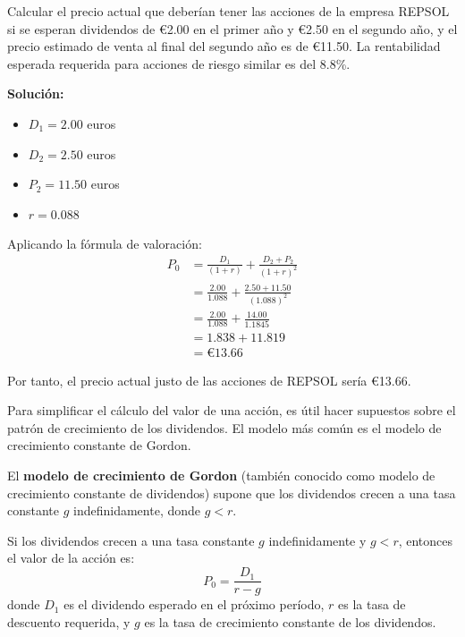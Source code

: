 \begin{ejemplo}
Calcular el precio actual que deberían tener las acciones de la empresa REPSOL si se esperan dividendos de €2.00 en el primer año y €2.50 en el segundo año, y el precio estimado de venta al final del segundo año es de €11.50. La rentabilidad esperada requerida para acciones de riesgo similar es del 8.8\%.

\textbf{Solución:}
\begin{itemize}
\item $D_1 = 2.00$ euros
\item $D_2 = 2.50$ euros
\item $P_2 = 11.50$ euros
\item $r = 0.088$
\end{itemize}

Aplicando la fórmula de valoración:
\begin{align*}
P_0 &= \frac{D_1}{(1+r)} + \frac{D_2 + P_2}{(1+r)^2} \\
&= \frac{2.00}{1.088} + \frac{2.50 + 11.50}{(1.088)^2} \\
&= \frac{2.00}{1.088} + \frac{14.00}{1.1845} \\
&= 1.838 + 11.819 \\
&= \text{€}13.66
\end{align*}

Por tanto, el precio actual justo de las acciones de REPSOL sería €13.66.
\end{ejemplo}

Para simplificar el cálculo del valor de una acción, es útil hacer supuestos sobre el patrón de crecimiento de los dividendos. El modelo más común es el modelo de crecimiento constante de Gordon.

\begin{definicion}
El \textbf{modelo de crecimiento de Gordon} (también conocido como modelo de crecimiento constante de dividendos) supone que los dividendos crecen a una tasa constante $g$ indefinidamente, donde $g < r$.
\end{definicion}

\begin{teorema}
Si los dividendos crecen a una tasa constante $g$ indefinidamente y $g < r$, entonces el valor de la acción es:
\begin{equation}
P_0 = \frac{D_1}{r - g}
\end{equation}
donde $D_1$ es el dividendo esperado en el próximo período, $r$ es la tasa de descuento requerida, y $g$ es la tasa de crecimiento constante de los dividendos.
\end{teorema}

